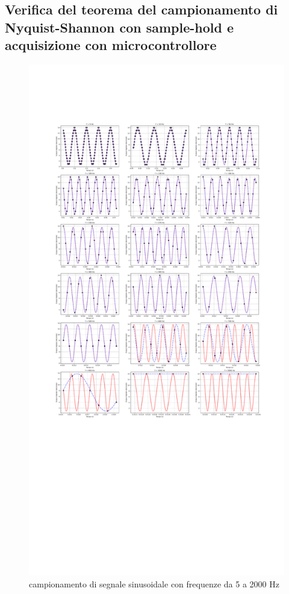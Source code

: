 \documentclass[journal]{IEEEtran}
\begin{document}
\subsection{Verifica del teorema del campionamento di Nyquist-Shannon con sample-hold e acquisizione con microcontrollore}


\clearpage 
\begin{figure}[t]%
\centering
\includegraphics[trim = {150 0 0 400}, width=1.1\textwidth]{analysis/output/cumulative_nyquist_mcu.pdf}
\caption{campionamento di segnale sinusoidale con frequenze da 5 a 2000 Hz}
\label{fig:nyquist_mcu_cumulative}
\end{figure}
\end{document}
